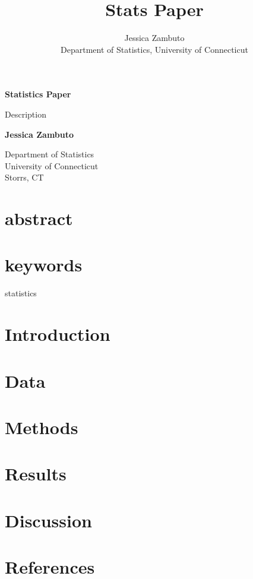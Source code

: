\documentclass[12pt]{article}
\title{Stats Paper}
\author{Jessica Zambuto\\
Department of Statistics, University of Connecticut}
\begin{document}
\begin{titlepage}
	\begin{center}
		\vspace*{1cm}
      		 \Huge
       		\textbf{Statistics Paper}

     		 \Large
      		 \vspace{0.5cm}
        		Description
            
      		 \vspace{1.5cm}

      		 \textbf{Jessica Zambuto}
       
       		\vfill

              
       		 \Large    
      		Department of Statistics\\
       		University of Connecticut\\
       		Storrs, CT\\
            
   \end{center}
\end{titlepage}

\section*{abstract}
\section*{keywords}
statistics

\section{Introduction}


\section{Data}

\section{Methods}

\section{Results}

\section{Discussion}

\section{References}
\end{document}
